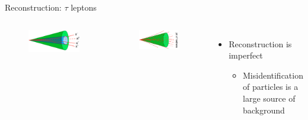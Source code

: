 \documentclass[aspectratio=169,xcolor=table]{beamer}
\begin{document}
\begin{frame}[t]{Reconstruction: $\tau$ leptons}
\begin{columns}
        \centering
        \begin{figure}
        \includegraphics[width=.45\textwidth,keepaspectratio=true]{tau_hadronic_decay.png}
        \end{figure}
        \begin{figure}
        \includegraphics[width=.45\textwidth,keepaspectratio=true]{jet_particle.png}
        \caption{\tiny \cite{tau-diagrams}}
        \end{figure}
        \begin{itemize}
          \item Reconstruction is imperfect
          \begin{itemize}
            \item Misidentification of particles is a large source of background
          \end{itemize}
        \end{itemize}
      \end{columns}
    \end{frame}
\end{document}
